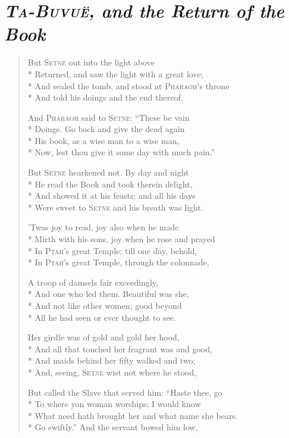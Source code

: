\documentclass[12pt]{article}
\newcommand{\vin}{\hspace{1em}}
\begin{document}
\section*{\mdseries\itshape \textsc{Ta-Buvu\"{e}}, and the Return of the Book}

\begin{verse}
But \textsc{Setne} out into the light above\\*
Returned, and saw the light with a great love;\\*
\vin And sealed the tomb, and stood at \textsc{Pharaoh}'s throne\\*
And told his doings and the end thereof.

And \textsc{Pharaoh} said to \textsc{Setne}: ``These be vain\\*
Doings. Go back and give the dead again\\*
\vin His book, as a wise man to a wise man,\\*
Now, lest thou give it some day with much pain.''

But \textsc{Setne} hearkened not. By day and night\\*
He read the Book and took therein delight,\\*
\vin And showed it at his feasts; and all his days\\*
Were sweet to \textsc{Setne} and his breath was light.

'Twas joy to read, joy also when he made\\*
Mirth with his sons, joy when he rose and prayed\\*
\vin In \textsc{Ptah}'s great Temple; till one day, behold,\\*
In \textsc{Ptah}'s great Temple, through the colonnade,

A troop of damsels fair exceedingly,\\*
And one who led them. Beautiful was she,\\*
\vin And not like other women; good beyond\\*
All he had seen or ever thought to see.

Her girdle was of gold and gold her hood,\\*
And all that touched her fragrant was and good,\\*
\vin And maids behind her fifty walked and two;\\*
And, seeing, \textsc{Setne} wist not where he stood,

But called the Slave that served him: ``Haste thee, go\\*
To where yon woman worships; I would know\\*
\vin What need hath brought her and what name she bears.\\*
Go swiftly.'' And the servant bowed him low,


\end{verse}
\end{document}
